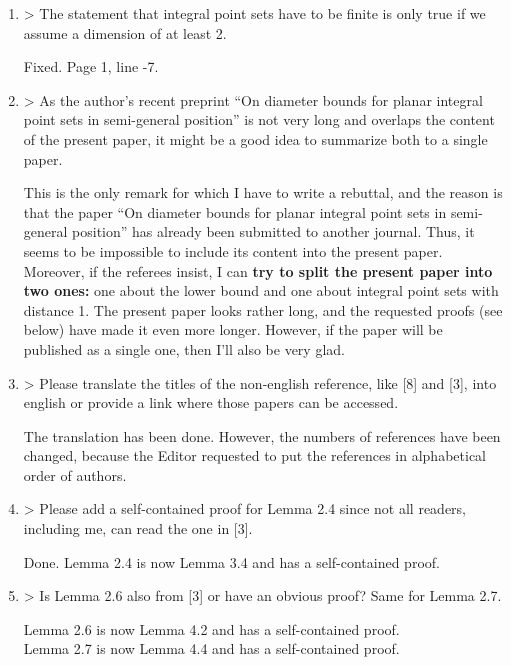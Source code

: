 \documentclass[a4paper,14pt]{article} %
\begin{document}
\begin{enumerate}
	\item
		> The statement that integral point sets have to be finite is only true if we assume a dimension of at least 2.

		Fixed. Page 1, line -7.


	\item

		> As the author’s recent preprint
		``On diameter bounds for planar integral point sets in semi-general position''
		is not very long and overlaps the content of the present paper,
		it might be a good idea to summarize both to a single paper.

		This is the only remark for which I have to write a rebuttal,
		and the reason is that
		the paper ``On diameter bounds for planar integral point sets in semi-general position''
		has already been submitted to another journal.
		Thus, it seems to be impossible to include its content into the present paper.
		Moreover, if the referees insist, I can
		\textbf{
		try to split the present paper into two ones:
		}
		one about the lower bound and one about integral point sets with distance 1.
		The present paper looks rather long, and the requested proofs (see below)
		have made it even more longer.
		However, if the paper will be published as a single one, then I'll also be very glad.


	\item

		> Please translate the titles of the non-english reference, like [8] and [3],
		into english or provide a link where those papers can be accessed.

		The translation has been done.
		However, the numbers of references have been changed, because
		the Editor requested to put the references in alphabetical order of authors.


	\item

		> Please add a self-contained proof for Lemma 2.4 since not all readers, including me, can read the one in [3].

		Done. Lemma 2.4 is now Lemma 3.4 and has a self-contained proof.


	\item

		> Is Lemma 2.6 also from [3] or have an obvious proof? Same for Lemma 2.7.

		Lemma 2.6 is now Lemma 4.2 and has a self-contained proof.
		\\
		Lemma 2.7 is now Lemma 4.4 and has a self-contained proof.



\end{enumerate}
\end{document}
